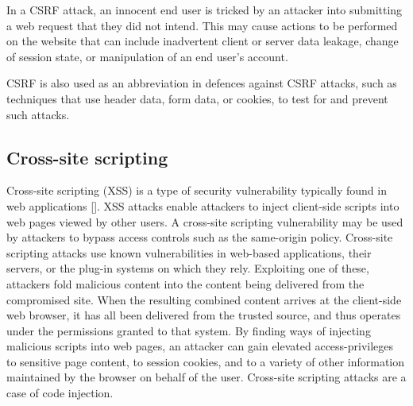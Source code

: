 In a CSRF attack, an innocent end user is tricked by an attacker into submitting a web request that they did not intend.
This may cause actions to be performed on the website that can include inadvertent client or server data leakage,
change of session state, or manipulation of an end user's account.

CSRF is also used as an abbreviation in defences against CSRF attacks, such as techniques that use header data,
form data, or cookies, to test for and prevent such attacks.

\subsection{Cross-site scripting}\label{subsec:cross-site-scripting}
Cross-site scripting (XSS) is a type of security vulnerability typically found in web applications [\cite{vogt2007cross}].
XSS attacks enable attackers to inject client-side scripts into web pages viewed by other users.
A cross-site scripting vulnerability may be used by attackers to bypass access controls such as the same-origin policy.
Cross-site scripting attacks use known vulnerabilities in web-based applications, their servers, or the plug-in systems
on which they rely.
Exploiting one of these, attackers fold malicious content into the content being delivered from the compromised site.
When the resulting combined content arrives at the client-side web browser, it has all been delivered from the trusted source,
and thus operates under the permissions granted to that system.
By finding ways of injecting malicious scripts into web pages, an attacker can gain elevated access-privileges
to sensitive page content, to session cookies, and to a variety of other information maintained by the browser on
behalf of the user.
Cross-site scripting attacks are a case of code injection.